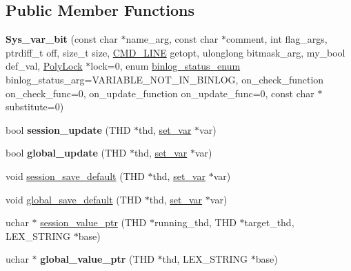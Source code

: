 \subsection*{Public Member Functions}
\begin{DoxyCompactItemize}
\item 
\mbox{\label{classSys__var__bit_af6f19ad05e93dbf6ef20ce87d2ec817a}} 
{\bfseries Sys\+\_\+var\+\_\+bit} (const char $\ast$name\+\_\+arg, const char $\ast$comment, int flag\+\_\+args, ptrdiff\+\_\+t off, size\+\_\+t size, \mbox{\hyperlink{structCMD__LINE}{C\+M\+D\+\_\+\+L\+I\+NE}} getopt, ulonglong bitmask\+\_\+arg, my\+\_\+bool def\+\_\+val, \mbox{\hyperlink{classPolyLock}{Poly\+Lock}} $\ast$lock=0, enum \mbox{\hyperlink{classsys__var_a664520ec82191888717c86085bfa83ce}{binlog\+\_\+status\+\_\+enum}} binlog\+\_\+status\+\_\+arg=V\+A\+R\+I\+A\+B\+L\+E\+\_\+\+N\+O\+T\+\_\+\+I\+N\+\_\+\+B\+I\+N\+L\+OG, on\+\_\+check\+\_\+function on\+\_\+check\+\_\+func=0, on\+\_\+update\+\_\+function on\+\_\+update\+\_\+func=0, const char $\ast$substitute=0)
\item 
\mbox{\label{classSys__var__bit_aa34cd759ddc7fda2f7abd2da05c649a9}} 
bool {\bfseries session\+\_\+update} (T\+HD $\ast$thd, \mbox{\hyperlink{classset__var}{set\+\_\+var}} $\ast$var)
\item 
\mbox{\label{classSys__var__bit_a65f724f0cc9f01d61c9b13bb923434ba}} 
bool {\bfseries global\+\_\+update} (T\+HD $\ast$thd, \mbox{\hyperlink{classset__var}{set\+\_\+var}} $\ast$var)
\item 
void \mbox{\hyperlink{classSys__var__bit_a9611a980dc87e18859904f481f51a164}{session\+\_\+save\+\_\+default}} (T\+HD $\ast$thd, \mbox{\hyperlink{classset__var}{set\+\_\+var}} $\ast$var)
\item 
void \mbox{\hyperlink{classSys__var__bit_a44c80cb8e9522287ac4788dfc65ad5c0}{global\+\_\+save\+\_\+default}} (T\+HD $\ast$thd, \mbox{\hyperlink{classset__var}{set\+\_\+var}} $\ast$var)
\item 
uchar $\ast$ \mbox{\hyperlink{classSys__var__bit_a2fdba870c82b26cb3777a7cab918412a}{session\+\_\+value\+\_\+ptr}} (T\+HD $\ast$running\+\_\+thd, T\+HD $\ast$target\+\_\+thd, L\+E\+X\+\_\+\+S\+T\+R\+I\+NG $\ast$base)
\item 
\mbox{\label{classSys__var__bit_a156daa35ec08e99e8c361f7ace9cd4bb}} 
uchar $\ast$ {\bfseries global\+\_\+value\+\_\+ptr} (T\+HD $\ast$thd, L\+E\+X\+\_\+\+S\+T\+R\+I\+NG $\ast$base)
\end{DoxyCompactItemize}
